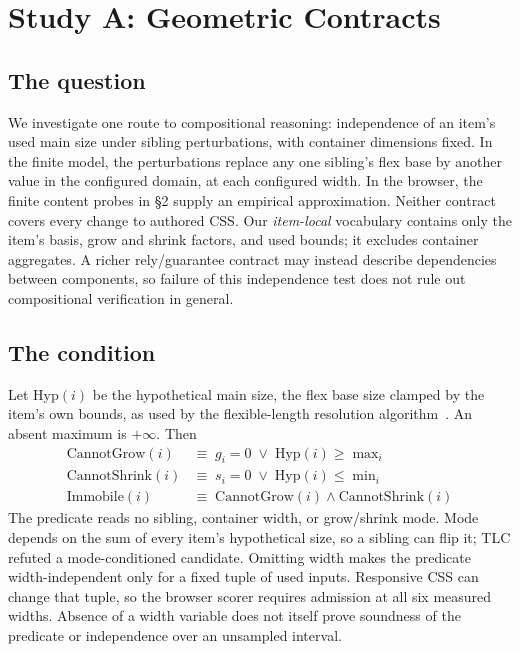 \documentclass[acmsmall,screen,review,anonymous,nonacm]{acmart}
\begin{document}
\section{Study A: Geometric Contracts}

\subsection{The question}
We investigate one route to compositional reasoning: independence of an item's used main size under sibling perturbations, with container dimensions fixed. In the finite model, the perturbations replace any one sibling's flex base by another value in the configured domain, at each configured width. In the browser, the finite content probes in \S2 supply an empirical approximation. Neither contract covers every change to authored CSS. Our \emph{item-local} vocabulary contains only the item's basis, grow and shrink factors, and used bounds; it excludes container aggregates. A richer rely/guarantee contract may instead describe dependencies between components, so failure of this independence test does not rule out compositional verification in general.

\subsection{The condition}
Let $\mathrm{Hyp}(i)$ be the hypothetical main size, the flex base size clamped by the item's own bounds, as used by the flexible-length resolution algorithm~\cite{csswg}. An absent maximum is $+\infty$. Then
\begin{align*}
\mathrm{CannotGrow}(i)   &\equiv\; g_i = 0 \;\vee\; \mathrm{Hyp}(i) \ge \max\nolimits_i\\[-0.15em]
\mathrm{CannotShrink}(i) &\equiv\; s_i = 0 \;\vee\; \mathrm{Hyp}(i) \le \min\nolimits_i\\[-0.15em]
\mathrm{Immobile}(i)     &\equiv\; \mathrm{CannotGrow}(i) \wedge \mathrm{CannotShrink}(i)
\end{align*}
The predicate reads no sibling, container width, or grow/shrink mode. Mode depends on the sum of every item's hypothetical size, so a sibling can flip it; TLC refuted a mode-conditioned candidate. Omitting width makes the predicate width-independent only for a fixed tuple of used inputs. Responsive CSS can change that tuple, so the browser scorer requires admission at all six measured widths. Absence of a width variable does not itself prove soundness of the predicate or independence over an unsampled interval.
\end{document}
